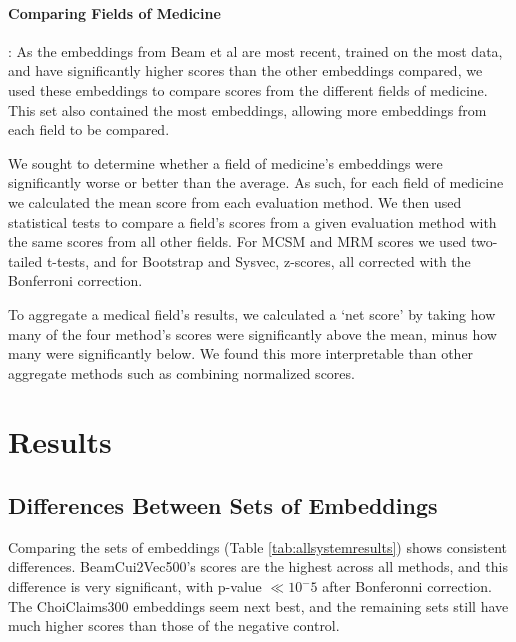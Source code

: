 \documentclass[11pt,a4paper]{article}
\begin{document}
\paragraph{Comparing Fields of Medicine}: As the embeddings from Beam et al  are most recent, trained on the most data, and have significantly higher scores than the other embeddings compared, we used these embeddings to compare scores from the different fields of medicine. This set also contained the most embeddings, allowing more embeddings from each field to be compared. 

We sought to determine whether a field of medicine's embeddings were significantly worse or better than the average. As such, for each field of medicine we calculated the mean score from each evaluation method. We then used statistical tests to compare a field's scores from a given evaluation method with the same scores from all other fields. For MCSM and MRM scores we used two-tailed t-tests, and for Bootstrap and Sysvec, z-scores, all corrected with the Bonferroni correction. 

To aggregate a medical field's results, we calculated a `net score' by taking how many of the four method's scores were significantly above the mean, minus how many were significantly below. We found this more interpretable than other aggregate methods such as combining normalized scores. 

\section{Results}


\subsection{Differences Between Sets of Embeddings}
Comparing the sets of embeddings (Table \ref{tab:allsystemresults}) shows consistent differences. BeamCui2Vec500's scores are the highest across all methods, and this difference is very significant, with p-value $\ll 10^-5$ after Bonferonni correction. The ChoiClaims300 embeddings seem next best, and the remaining sets still have much higher scores than those of the negative control. 
\end{document}
